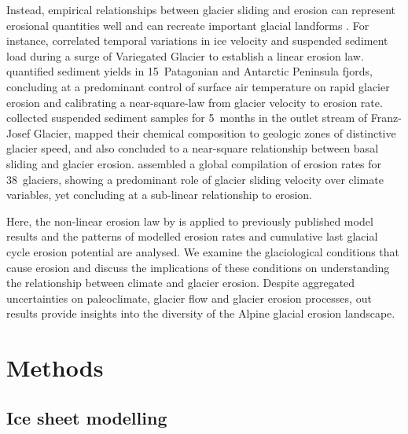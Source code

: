 \documentclass[esurf, manuscript]{copernicus}
\begin{document}
    Instead, empirical relationships between glacier sliding and erosion can
    represent erosional quantities well and can recreate important glacial
    landforms \citep[e.g.,][]{Harbor.etal.1988, Macgregor.etal.2000}.
    For instance, \citet{Humphrey.Raymond.1994} correlated temporal variations
    in ice velocity and suspended sediment load during a surge of Variegated
    Glacier to establish a linear erosion law.
    \citet{Koppes.etal.2015} quantified sediment
    yields in 15~Patagonian and Antarctic Peninsula fjords, concluding at a
    predominant control of surface air temperature on rapid glacier erosion and
    calibrating a near-square-law from glacier velocity to erosion rate.
    \citet{Herman.etal.2015} collected suspended sediment samples for 5~months
    in the outlet stream of Franz-Josef Glacier, mapped their chemical
    composition to geologic zones of distinctive glacier speed, and also
    concluded to a near-square relationship between basal sliding and glacier
    erosion.
    \citet{Cook.etal.2020} assembled a global compilation of erosion rates for
    38~glaciers, showing a predominant role of glacier sliding velocity over
    climate variables, yet concluding at a sub-linear relationship to erosion.

    Here, the non-linear erosion law by \citet{Koppes.etal.2015} is applied to
    previously published model results \citep{Seguinot.etal.2018} and the
    patterns of modelled erosion rates and cumulative last glacial cycle erosion
    potential are analysed. We examine the glaciological conditions that cause
    erosion and discuss the implications of these conditions on understanding
    the relationship between climate and glacier erosion. Despite aggregated
    uncertainties on paleoclimate, glacier flow and glacier erosion processes,
    out results provide insights into the diversity of the Alpine glacial
    erosion landscape.


\section{Methods}

\subsection{Ice sheet modelling}
\end{document}
